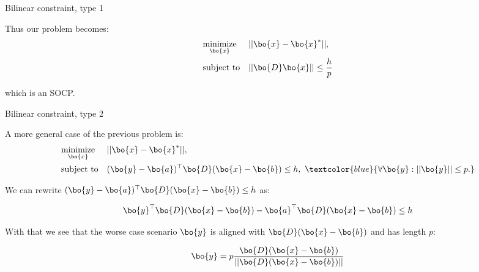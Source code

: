 \documentclass{beamer}
\begin{document}
\begin{frame}{Bilinear constraint, type 1}
\begin{flushleft}

Thus our problem becomes:
%
\begin{equation}
\begin{aligned}
& \underset{\bo{x}}{\text{minimize}}
& & ||\bo{x} - \bo{x}^*||, \\
& \text{subject to}
& & || \bo{D} \bo{x} || \leq \frac{h}{p}
\end{aligned}
\end{equation}

which is an SOCP.

\end{flushleft}
\end{frame}



\begin{frame}{Bilinear constraint, type 2}
\begin{flushleft}

A more general case of the previous problem is:
%
\begin{equation}
\begin{aligned}
& \underset{\bo{x}}{\text{minimize}} 
& & ||\bo{x} - \bo{x}^*||, \\
& \text{subject to}
& & (\bo{y} - \bo{a})^\top \bo{D} (\bo{x} - \bo{b}) \leq h, \ 
\textcolor{blue}{
	\forall \bo{y} :  ||\bo{y}|| \leq p.} 
\end{aligned}
\end{equation}
%

We can rewrite $(\bo{y} - \bo{a})^\top \bo{D} (\bo{x} - \bo{b}) \leq h$ as:

\begin{equation}
    \bo{y}^\top \bo{D} (\bo{x} - \bo{b}) - \bo{a}^\top \bo{D} (\bo{x} - \bo{b}) \leq h
\end{equation}

With that we see that the worse case scenario $\bo{y}$ is aligned with $\bo{D} (\bo{x} - \bo{b})$ and has length $p$:

\begin{equation}
    \bo{y} = p \frac{\bo{D} (\bo{x} - \bo{b})}{|| \bo{D} (\bo{x} - \bo{b}) ||}
\end{equation}

 
\end{flushleft}
\end{frame}
\end{document}
